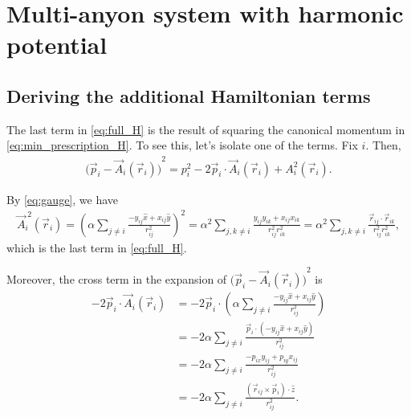 \chapter{Multi-anyon system with harmonic potential}\label{ch:Appendix_multi_anyon}


\section{Deriving the additional Hamiltonian terms}
The last term in \cref{eq:full_H} is the result of squaring the canonical momentum in \cref{eq:min_prescription_H}. To see this, let's isolate one of the terms. Fix $i$. Then,
\begin{align*}
    {\bigl(\vec{p}_i - \vec{A}_i(\vec{r}_i)\bigr)}^2 = {p}_i^{2} - 2\vec{p}_i\cdot\vec{A}_i(\vec{r}_i) + {A}_i^{2}(\vec{r}_i).
\end{align*}

By \cref{eq:gauge}, we have
\begin{align*}
    \vec{A}_i^{\;2}(\vec{r}_i) = {\left( \alpha\sum_{j\neq i}\frac{-y_{ij}\hat{x} + x_{ij}\hat{y}}{r_{ij}^2} \right)}^2 = \alpha^2\sum_{j,k\neq i}\frac{y_{ij}y_{ik} + x_{ij}x_{ik}}{r_{ij}^2r_{ik}^2} = \alpha^2\sum_{j,k\neq i}\frac{\vec{r}_{ij}\cdot\vec{r}_{ik}}{r_{ij}^2r_{ik}^2},
\end{align*}
which is the last term in \cref{eq:full_H}.

Moreover, the cross term in the expansion of ${\bigl(\vec{p}_i - \vec{A}_i(\vec{r}_i)\bigr)}^2$ is
\begin{align*}
    -2\vec{p}_i\cdot\vec{A}_i(\vec{r}_i) &= -2\vec{p}_i\cdot\left( \alpha\sum_{j\neq i}\frac{-y_{ij}\hat{x} + x_{ij}\hat{y}}{r_{ij}^2} \right) \\
    &= -2\alpha\sum_{j\neq i}\frac{\vec{p}_i\cdot\left( -y_{ij}\hat{x} + x_{ij}\hat{y} \right)}{r_{ij}^2} \\
    &= -2\alpha\sum_{j\neq i}\frac{-p_{ix}y_{ij} + p_{iy}x_{ij}}{r_{ij}^2} \\
    &= -2\alpha\sum_{j\neq i}\frac{(\vec{r}_{ij}\times\vec{p}_i)\cdot\hat{z}}{r_{ij}^2}.
\end{align*}

